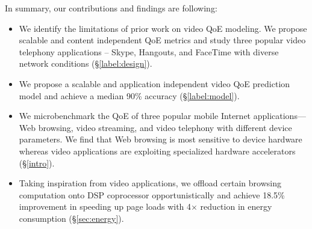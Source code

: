 In summary, our contributions and findings are following:

\begin{itemize}
\item We identify the limitations of prior work on video QoE modeling. We propose scalable and content independent QoE metrics and study three popular video telephony applications -- Skype, Hangouts, and FaceTime with diverse network conditions (\S \ref{label:design}).
\item We propose a scalable and application independent video QoE prediction model and achieve a median 90\% accuracy (\S \ref{label:model}).
\item We microbenchmark the QoE of three popular mobile Internet applications--- Web browsing, video streaming, and video telephony with different device parameters. We find that Web browsing is most sensitive to device hardware whereas video applications are exploiting specialized hardware accelerators (\S\ref{intro}). 
\item Taking inspiration from video applications, we offload certain browsing computation onto DSP coprocessor opportunistically and achieve 18.5\% improvement in speeding up page loads with 4$\times$ reduction in energy consumption (\S \ref{sec:energy}).
\end{itemize}

